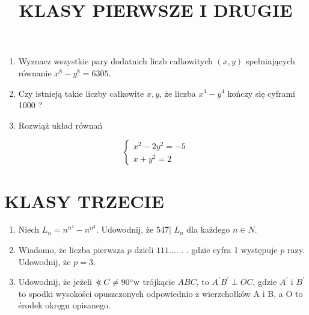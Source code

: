 \documentclass[10pt]{article}
\title{KLASY PIERWSZE I DRUGIE }
\author{}
\date{}
\newcommand\Varangle{\mathop{{<\!\!\!\!\!\text{\small)}}\:}\nolimits}
\begin{document}
\maketitle
\begin{enumerate}
  \item Wyznacz wszystkie pary dodatnich liczb całkowitych \((x, y)\) spełniających równanie \(x^{8}-y^{8}=6305\).
  \item Czy istnieją takie liczby całkowite \(x, y\), że liczba \(x^{4}-y^{4}\) kończy się cyframi 1000 ?
  \item Rozwiąż układ równań
\end{enumerate}

\[
\left\{\begin{array}{c}
x^{2}-2 y^{2}=-5 \\
x+y^{2}=2
\end{array}\right.
\]

\section*{KLASY TRZECIE}
\begin{enumerate}
  \item Niech \(L_{n}=n^{n^{4}}-n^{n^{2}}\). Udowodnij, że 547| \(L_{n}\) dla każdego \(n \in N\).
  \item Wiadomo, że liczba pierwsza \(p\) dzieli \(111 \ldots\). . . gdzie cyfra 1 występuje \(p\) razy. Udowodnij, że \(p=3\).
  \item Udowodnij, że jeżeli \(\Varangle C \neq 90^{\circ} \mathrm{w}\) trójkącie \(A B C\), to \(A^{\prime} B^{\prime} \perp O C\), gdzie \(A^{\prime}\) i \(B^{\prime}\) to spodki wysokości opuszczonych odpowiednio z wierzchołków A i B, a O to środek okręgu opisanego.
\end{enumerate}
\end{document}
